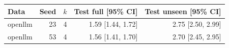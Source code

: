 \begin{tabular}{lrrrr}
\toprule
Data & Seed & $k$ & Test full [95\% CI] & Test unseen [95\% CI] \\
\midrule
openllm & 23 & 4 & 1.59 [1.44, 1.72] & 2.75 [2.50, 2.99] \\
openllm & 53 & 4 & 1.56 [1.41, 1.70] & 2.70 [2.45, 2.95] \\
\bottomrule
\end{tabular}
